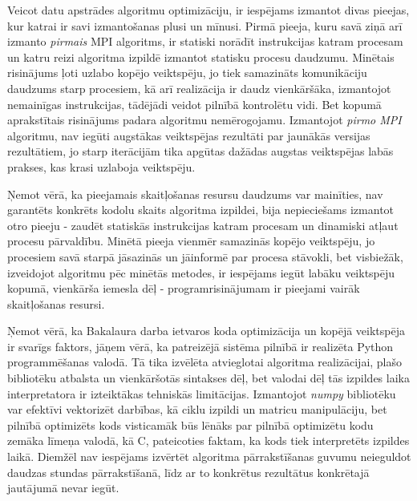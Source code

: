 Veicot datu apstrādes algoritmu optimizāciju, ir iespējams izmantot divas pieejas, kur katrai ir savi izmantošanas plusi un mīnusi. Pirmā pieeja, kuru savā ziņā arī izmanto \textit{pirmais} MPI algoritms, ir statiski norādīt instrukcijas katram procesam un katru reizi algoritma izpildē izmantot statisku procesu daudzumu. Minētais risinājums ļoti uzlabo kopējo veiktspēju, jo tiek samazināts komunikāciju daudzums starp procesiem, kā arī realizācija ir daudz vienkāršāka, izmantojot nemainīgas instrukcijas, tādējādi veidot pilnībā kontrolētu vidi. Bet kopumā aprakstītais risinājums padara algoritmu nemērogojamu. Izmantojot \textit{pirmo MPI} algoritmu, nav iegūti augstākas veiktspējas rezultāti par jaunākās versijas rezultātiem, jo starp iterācijām tika apgūtas dažādas augstas veiktspējas labās prakses, kas krasi uzlaboja veiktspēju.

Ņemot vērā, ka pieejamais skaitļošanas resursu daudzums var mainīties, nav garantēts konkrēts kodolu skaits algoritma izpildei, bija nepieciešams izmantot otro pieeju - zaudēt statiskās instrukcijas katram procesam un dinamiski atļaut procesu pārvaldību. Minētā pieeja vienmēr samazinās kopējo veiktspēju, jo procesiem savā starpā jāsazinās un jāinformē par procesa stāvokli, bet visbiežāk, izveidojot algoritmu pēc minētās metodes, ir iespējams iegūt labāku veiktspēju kopumā, vienkārša iemesla dēļ - programrisinājumam ir pieejami vairāk skaitļošanas resursi.

Ņemot vērā, ka Bakalaura darba ietvaros koda optimizācija un kopējā veiktspēja ir svarīgs faktors, jāņem vērā, ka patreizējā sistēma pilnībā ir realizēta Python programmēšanas valodā. Tā tika izvēlēta atvieglotai algoritma realizācijai, plašo bibliotēku atbalsta un vienkāršotās sintakses dēļ, bet valodai dēļ tās izpildes laika interpretatora ir izteiktākas tehniskās limitācijas. Izmantojot \textit{numpy} bibliotēku var efektīvi vektorizēt darbības, kā ciklu izpildi un matricu manipulāciju, bet pilnībā optimizēts kods visticamāk būs lēnāks par pilnībā optimizētu kodu zemāka līmeņa valodā, kā C, pateicoties faktam, ka kods tiek interpretēts izpildes laikā. Diemžēl nav iespējams izvērtēt algoritma pārrakstīšanas guvumu neieguldot daudzas stundas pārrakstīšanā, līdz ar to konkrētus rezultātus konkrētajā jautājumā nevar iegūt.
